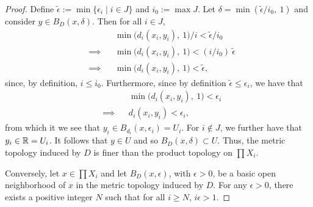 \begin{solution}
\begin{proof}
    Define $\tilde{\epsilon} := \min\{\epsilon_i \mid i \in J\}$ and $i_0 := \max{J}$.
    Let $\delta = \min(\tilde{\epsilon} / i_0,~ 1)$ and consider $y \in B_D(x, \delta)$.
    Then for all $i \in J$,
    \begin{equation*}
      \begin{alignedat}{2}
        &           && \min\big(d_i(x_i, y_i),~ 1) / i < \tilde{\epsilon} / i_0 \\
        & \implies  && \min\big(d_i(x_i, y_i),~ 1) <  (i / i_0)~ \tilde{\epsilon} \\
        & \implies  && \min\big(d_i(x_i, y_i),~ 1) <  \tilde{\epsilon},
      \end{alignedat}
    \end{equation*}
    since, by definition, $i \leq i_0$.
    Furthermore, since by definition $\tilde{\epsilon} \leq \epsilon_i$, we have that
    \begin{equation*}
      \begin{alignedat}{2}
        &           && \min\big(d_i(x_i, y_i),~ 1) < \epsilon_i \\
        & \implies  && d_i(x_i, y_i) < \epsilon_i,
      \end{alignedat}
    \end{equation*}
    from which it we see that $y_i \in B_{d_i}(x, \epsilon_i) = U_i$.
    For $i \not\in J$, we further have that $y_i \in \mathbb{R} = U_i$.
    It follows that $y \in U$ and so $B_D(x, \delta) \subset U$.
    Thus, the metric topology induced by $D$ is finer than the product topology on $\prod X_i$.

    Conversely, let $x \in \prod X_i$ and let $B_D(x, \epsilon)$, with $\epsilon > 0$, be a basic open neighborhood of $x$ in the metric topology induced by $D$.
    For any $\epsilon > 0$, there exists a positive integer $N$ such that for all $i \geq N$, $i \epsilon > 1$.


\end{proof}
\end{solution}

